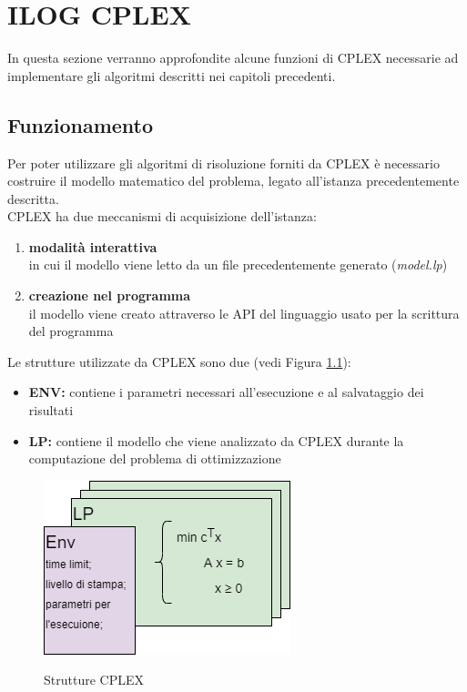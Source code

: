 \chapter{ILOG CPLEX}\label{CPLEX_func}
In questa sezione verranno approfondite alcune funzioni di CPLEX necessarie ad implementare gli algoritmi descritti nei capitoli precedenti.

\section{Funzionamento}
Per poter utilizzare gli algoritmi di risoluzione forniti da CPLEX è necessario costruire il modello matematico del problema, legato all'istanza precedentemente descritta.\\
CPLEX ha due meccanismi di acquisizione dell'istanza:
\begin{enumerate}
\item{\textbf{modalità interattiva}\\
in cui il modello viene letto da un file precedentemente generato (\textit{model.lp})}
\item{\textbf{creazione nel programma}\\
il modello viene creato attraverso le API del linguaggio usato per la scrittura del programma}
\end{enumerate}

Le strutture utilizzate da CPLEX sono due (vedi Figura \ref{strutture_cplex}):
\begin{itemize}
\item{\textbf{ENV:} contiene i parametri necessari all'esecuzione e al salvataggio dei risultati}
\item{\textbf{LP:} contiene il modello che viene analizzato da CPLEX durante la computazione del problema di ottimizzazione}
\end{itemize}

\begin{figure}[h] 
\begin{center} 
  \includegraphics[scale=0.7]{Images/cplex_structs}\\ 
  \caption{\footnotesize{Strutture CPLEX}}
  \label{strutture_cplex} 
\end{center} 
\end{figure}

